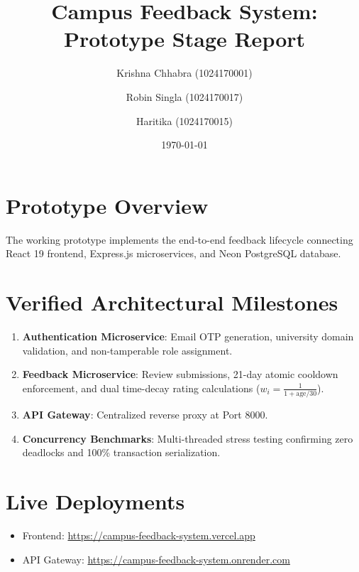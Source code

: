 \documentclass[11pt,a4paper]{article}
\title{Campus Feedback System: Prototype Stage Report}
\author{
  Krishna Chhabra (1024170001) \and 
  Robin Singla (1024170017) \and 
  Haritika (1024170015)
}
\date{\today}
\begin{document}
\maketitle

\section{Prototype Overview}
The working prototype implements the end-to-end feedback lifecycle connecting React 19 frontend, Express.js microservices, and Neon PostgreSQL database.

\section{Verified Architectural Milestones}
\begin{enumerate}
    \item \textbf{Authentication Microservice}: Email OTP generation, university domain validation, and non-tamperable role assignment.
    \item \textbf{Feedback Microservice}: Review submissions, 21-day atomic cooldown enforcement, and dual time-decay rating calculations ($w_i = \frac{1}{1 + \text{age}/30}$).
    \item \textbf{API Gateway}: Centralized reverse proxy at Port 8000.
    \item \textbf{Concurrency Benchmarks}: Multi-threaded stress testing confirming zero deadlocks and 100\% transaction serialization.
\end{enumerate}

\section{Live Deployments}
\begin{itemize}
    \item Frontend: \url{https://campus-feedback-system.vercel.app}
    \item API Gateway: \url{https://campus-feedback-system.onrender.com}
\end{itemize}
\end{document}
